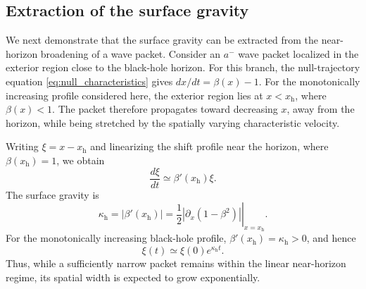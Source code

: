 \documentclass[reprint,amsmath,amssymb,aps,showkeys,superscriptaddress]{revtex4-2}
\begin{document}
\subsection{Extraction of the surface gravity}
\label{subsec:surface_gravity}

We next demonstrate that the surface gravity can be extracted from
the near-horizon broadening of a wave packet. Consider an $a^-$
wave packet localized in the exterior region close to the
black-hole horizon. For this branch, the null-trajectory equation
\eqref{eq:null_characteristics} gives
$dx/dt=\beta(x)-1$. For the monotonically increasing profile
considered here, the exterior region lies at $x<x_{\mathrm h}$,
where $\beta(x)<1$. The packet therefore propagates toward
decreasing $x$, away from the horizon, while being stretched by the
spatially varying characteristic velocity.

Writing $\xi=x-x_{\mathrm h}$ and linearizing the shift profile
near the horizon, where $\beta(x_{\mathrm h})=1$, we obtain
\begin{equation}
  \frac{d\xi}{dt}
  \simeq
  \beta'(x_{\mathrm h})\xi.
  \label{eq:near_horizon_linearization}
\end{equation}
The surface gravity is
\begin{equation}
  \kappa_{\mathrm h}
  =
  \left|
    \beta'(x_{\mathrm h})
  \right|
  =
  \left.
  \frac{1}{2}
  \left|
    \partial_x\left(1-\beta^2\right)
  \right|
  \right|_{x=x_{\mathrm h}}.
  \label{eq:surface_gravity}
\end{equation}
For the monotonically increasing black-hole profile,
$\beta'(x_{\mathrm h})=\kappa_{\mathrm h}>0$, and hence
\begin{equation}
  \xi(t)
  \simeq
  \xi(0)e^{\kappa_{\mathrm h}t}.
  \label{eq:near_horizon_separation}
\end{equation}
Thus, while a sufficiently narrow packet remains within the
linear near-horizon regime, its spatial width is expected to grow
exponentially.
\end{document}
